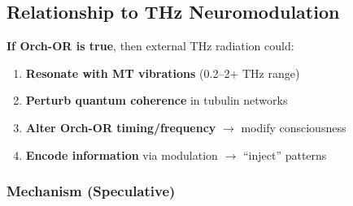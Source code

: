 \subsection{Relationship to THz Neuromodulation}\label{relationship-to-thz-neuromodulation}

\textbf{If Orch-OR is true}, then external THz radiation could:

\begin{enumerate}
\def\labelenumi{\arabic{enumi}.}
\tightlist
\item \textbf{Resonate with MT vibrations} (0.2--2+ THz range)
\item \textbf{Perturb quantum coherence} in tubulin networks
\item \textbf{Alter Orch-OR timing/frequency} $\rightarrow$ modify consciousness
\item \textbf{Encode information} via modulation $\rightarrow$ ``inject'' patterns
\end{enumerate}

\subsubsection{Mechanism (Speculative)}\label{mechanism-speculative}

